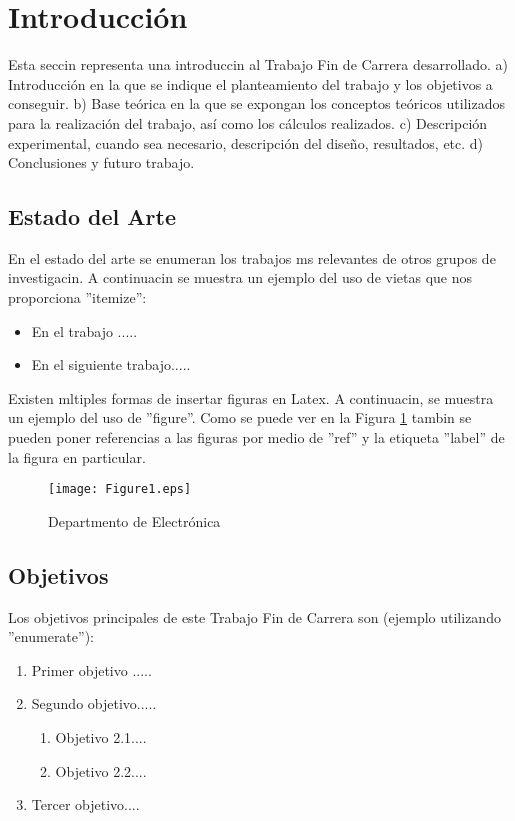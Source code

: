 \section{Introducci\'on}
Esta seccin representa una introduccin al Trabajo Fin de Carrera desarrollado.
a) Introducción en la que se indique el planteamiento del trabajo y los
objetivos a conseguir.
b) Base teórica en la que se expongan los conceptos teóricos utilizados para
la realización del trabajo, así como los cálculos realizados.
c) Descripción experimental, cuando sea necesario, descripción del diseño,
resultados, etc.
d) Conclusiones y futuro trabajo.


\subsection{Estado del Arte}
En el estado del arte se enumeran los trabajos ms relevantes de otros grupos de investigacin. A continuacin se muestra un ejemplo del uso de vietas que nos proporciona ''itemize'':

\begin{itemize}
\item En el trabajo ..... 
\item En el siguiente trabajo.....
\end{itemize}

Existen mltiples formas de insertar figuras en Latex. A continuacin, se muestra un ejemplo del uso de ''figure''. Como se puede ver en la Figura \ref{fig1} tambin se pueden poner referencias a las figuras por medio de ''ref'' y la etiqueta ''label'' de la figura en particular.

\begin{figure}[h] %
\centering
\texttt{[image: Figure1.eps]}
\caption{Departmento de Electr\'onica}
\label{fig1}
\end{figure}



\subsection{Objetivos}

Los objetivos principales de este Trabajo Fin de Carrera son (ejemplo utilizando ''enumerate''):

\begin{enumerate}
\item Primer objetivo ..... 
\item Segundo objetivo.....
  \begin{enumerate}
  \item Objetivo 2.1....
  \item Objetivo 2.2....
  \end{enumerate}
\item Tercer objetivo....
\end{enumerate}


